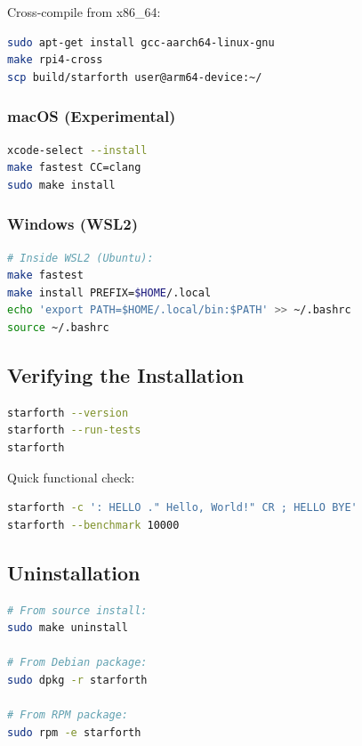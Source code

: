 Cross-compile from x86\_64:

\begin{lstlisting}[language=bash]
sudo apt-get install gcc-aarch64-linux-gnu
make rpi4-cross
scp build/starforth user@arm64-device:~/
\end{lstlisting}

\subsubsection{macOS (Experimental)}

\begin{lstlisting}[language=bash]
xcode-select --install
make fastest CC=clang
sudo make install
\end{lstlisting}

\subsubsection{Windows (WSL2)}

\begin{lstlisting}[language=bash]
# Inside WSL2 (Ubuntu):
make fastest
make install PREFIX=$HOME/.local
echo 'export PATH=$HOME/.local/bin:$PATH' >> ~/.bashrc
source ~/.bashrc
\end{lstlisting}

\subsection{Verifying the Installation}
\label{sec:install-verify}

\begin{lstlisting}[language=bash]
starforth --version
starforth --run-tests
starforth
\end{lstlisting}

Quick functional check:

\begin{lstlisting}[language=bash]
starforth -c ': HELLO ." Hello, World!" CR ; HELLO BYE'
starforth --benchmark 10000
\end{lstlisting}

\subsection{Uninstallation}
\label{sec:install-remove}

\begin{lstlisting}[language=bash]
# From source install:
sudo make uninstall

# From Debian package:
sudo dpkg -r starforth

# From RPM package:
sudo rpm -e starforth
\end{lstlisting}

